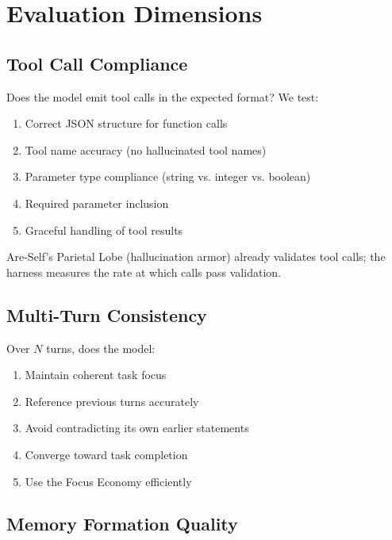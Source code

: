 \documentclass[man,12pt,floatsintext]{apa7}
\begin{document}

\section{Evaluation Dimensions}

\subsection{Tool Call Compliance}

Does the model emit tool calls in the expected format? We test:

\begin{enumerate}
  \item Correct JSON structure for function calls
  \item Tool name accuracy (no hallucinated tool names)
  \item Parameter type compliance (string vs. integer vs. boolean)
  \item Required parameter inclusion
  \item Graceful handling of tool results
\end{enumerate}

Are-Self's Parietal Lobe (hallucination armor) already validates tool calls; the harness
measures the rate at which calls pass validation.

\subsection{Multi-Turn Consistency}

Over $N$ turns, does the model:

\begin{enumerate}
  \item Maintain coherent task focus
  \item Reference previous turns accurately
  \item Avoid contradicting its own earlier statements
  \item Converge toward task completion
  \item Use the Focus Economy efficiently
\end{enumerate}

\subsection{Memory Formation Quality}
\end{document}

